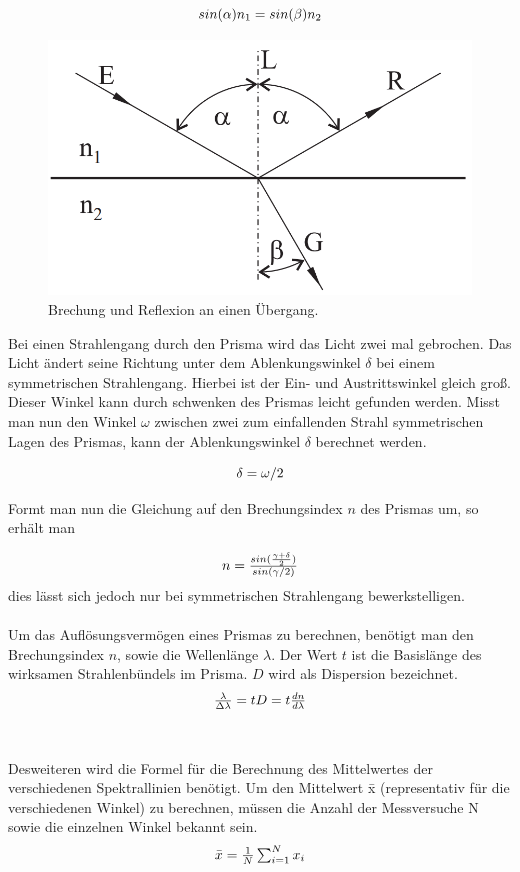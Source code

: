 \documentclass[12pt,a4paper,twoside]{article}
\begin{document}
\begin{equation}
    \label{eq:Snellius}
    \centerline{$sin(\alpha) n_1 = sin(\beta) n_2$}
\end{equation}

\begin{figure}[H]
    \centering
    \includegraphics[width=0.6\linewidth]{nudes/Brechung.png}
    \caption{Brechung und Reflexion an einen Übergang. \cite{teachcenter2}}
    \label{fig:brechung}
\end{figure}

\noindent
Bei einen Strahlengang durch den Prisma wird das Licht zwei mal gebrochen. 
Das Licht ändert seine Richtung unter dem Ablenkungswinkel $\delta $ bei einem symmetrischen Strahlengang. Hierbei ist der Ein- und Austrittswinkel gleich groß. 
Dieser Winkel kann durch schwenken des Prismas leicht gefunden werden. 
Misst man nun den Winkel $\omega$ zwischen zwei zum einfallenden Strahl symmetrischen Lagen des Prismas, kann der Ablenkungswinkel $\delta $ berechnet werden. 

\begin{equation}
    \label{eq:Ablenkungswinkel}
    \centerline{$\delta = \omega /2$}
\end{equation}

\noindent
Formt man nun die Gleichung auf den Brechungsindex $n$ des Prismas um, so erhält man

\begin{equation}
    \label{eq:Brechungsindex}
    \centerline{$ n = \frac{sin(\frac{\gamma + \delta }{2})}{sin(\gamma /2)}$}
\end{equation}
dies lässt sich jedoch nur bei symmetrischen Strahlengang bewerkstelligen. 
\\
\\
Um das Auflösungsvermögen eines Prismas zu berechnen, benötigt man den Brechungsindex $n$, sowie die Wellenlänge $\lambda$. Der Wert $t$ ist die Basislänge des wirksamen Strahlenbündels im Prisma. $D$ wird als Dispersion bezeichnet. 
\begin{equation}
    \label{eq:Auflösungsvermögen Prisma}
    \centerline{$\frac{\lambda}{\Delta \lambda} = tD = t \frac{dn}{d \lambda}$}
\end{equation}
\\
\\
Desweiteren wird die Formel für die Berechnung des Mittelwertes der verschiedenen Spektrallinien benötigt. Um den Mittelwert \={x} (representativ für die verschiedenen Winkel) zu berechnen, müssen die Anzahl der Messversuche N sowie die einzelnen Winkel bekannt sein. 
\begin{equation}
    \label{eq:Mittelwert}
    \centerline{$\bar{x} = \frac{1}{N} \sum_{i = 1}^{N} x_i $}
\end{equation}
\end{document}
